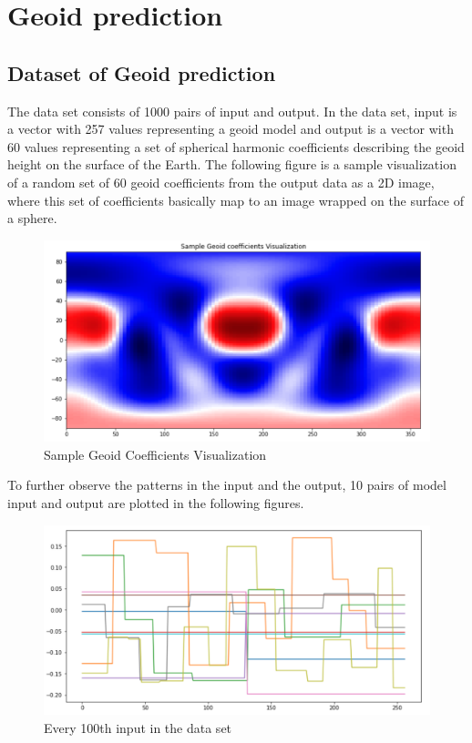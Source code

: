 \chapter{Geoid prediction}\label{chap:content}

\section{Dataset of Geoid prediction}

The data set consists of 1000 pairs of input and output. In the data set, input is a vector with 257 values representing a geoid model and output is a vector with 60 values representing a set of spherical harmonic coefficients describing the geoid height on the surface of the Earth. The following figure is a sample visualization of a random set of 60 geoid coefficients from the output data as a 2D image, where this set of coefficients basically map to an image wrapped on the surface of a sphere.

\begin{figure}[H]
    \caption{Sample Geoid Coefficients Visualization}
    \includegraphics[scale=0.6]{figures/geoid_images/Geoid_Sample_visualization.png}
\end{figure}

To further observe the patterns in the input and the output, 10 pairs of model input and output are plotted in the following figures.

\begin{figure}[H]
    \caption{Every 100th input in the data set}
    \includegraphics[scale=0.6]{figures/geoid_images/Geoid_sample_input.png}
\end{figure}

